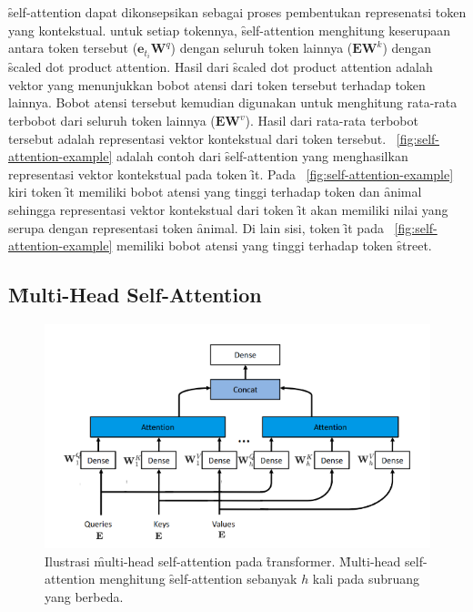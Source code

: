 	\f{self-attention} dapat dikonsepsikan sebagai proses pembentukan represenatsi token yang kontekstual. untuk setiap tokennya, \f{self-attention} menghitung keserupaan antara token tersebut ($\mathbf{e}_{t_i} \mathbf{W}^q$) dengan seluruh token lainnya ($\mathbf{E} \mathbf{W}^k$) dengan \f{scaled dot product attention}. Hasil dari \f{scaled dot product attention} adalah vektor yang menunjukkan bobot atensi dari token tersebut terhadap token lainnya. Bobot atensi tersebut kemudian digunakan untuk menghitung rata-rata terbobot dari seluruh token lainnya ($\mathbf{E} \mathbf{W}^v$). Hasil dari rata-rata terbobot tersebut adalah representasi vektor kontekstual dari token tersebut. \pic~\ref{fig:self-attention-example} adalah contoh dari \f{self-attention} yang menghasilkan representasi vektor kontekstual pada token \f{it}. Pada \pic~\ref{fig:self-attention-example} kiri token \f{it} memiliki bobot atensi yang tinggi terhadap token dan \f{animal} sehingga representasi vektor kontekstual dari token \f{it} akan memiliki nilai yang serupa dengan representasi token \f{animal}. Di lain sisi, token \f{it} pada \pic~\ref{fig:self-attention-example} memiliki bobot atensi yang tinggi terhadap token \f{street}.
	
	\subsection{\f{Multi-Head Self-Attention}}

	\begin{figure}
		\centering
		\includegraphics[width=1\textwidth]{assets/pics/MHSA.png}
		\caption{Ilustrasi \f{multi-head self-attention} pada \f{transformer}. \f{Multi-head self-attention} menghitung \f{self-attention} sebanyak $h$ kali pada subruang yang berbeda.}
		\label{fig:multi-head-self-attention}
	\end{figure}

